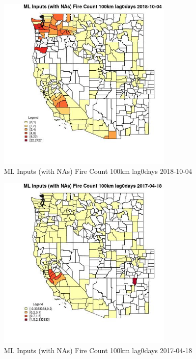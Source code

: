 \begin{figure} 
\centering  
\includegraphics[width=0.77\textwidth]{Code_Outputs/Report_ML_input_PM25_Step4_part_f_de_duplicated_aveswNAs_CountyFire_Count_100km_lag0daysMean2018-10-04.jpg} 
\caption{\label{fig:Report_ML_input_PM25_Step4_part_f_de_duplicated_aveswNAsCountyFire_Count_100km_lag0daysMean2018-10-04}ML Inputs (with NAs) Fire Count 100km lag0days 2018-10-04} 
\end{figure} 
 

\begin{figure} 
\centering  
\includegraphics[width=0.77\textwidth]{Code_Outputs/Report_ML_input_PM25_Step4_part_f_de_duplicated_aveswNAs_CountyFire_Count_100km_lag0daysMean2017-04-18.jpg} 
\caption{\label{fig:Report_ML_input_PM25_Step4_part_f_de_duplicated_aveswNAsCountyFire_Count_100km_lag0daysMean2017-04-18}ML Inputs (with NAs) Fire Count 100km lag0days 2017-04-18} 
\end{figure} 
 

